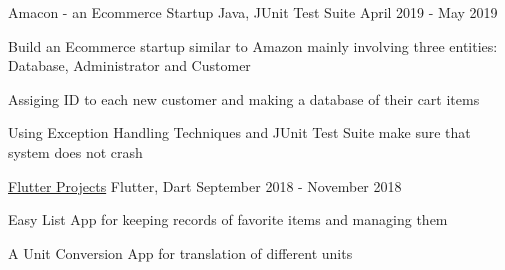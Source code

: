 \begin{cventries}
        \projects
      {} %
       {Amacon - an Ecommerce Startup} %
       {Java, JUnit Test Suite} %
       {April 2019 - May 2019} %
       {
         \begin{cvitems} %
           \item {Build an Ecommerce startup similar to Amazon mainly involving three entities: Database, Administrator and Customer}
           \item {Assiging ID to each new customer and making a database of their cart items}
           \item {Using Exception Handling Techniques and JUnit Test Suite make sure that system does not crash}
         \end{cvitems}
       }


  \projects
    {} %
    {\href{https://github.com/parthgoyal123/Flutter-Projects}{Flutter Projects}} %
    {Flutter, Dart} %
    {September 2018 - November 2018} %
    {
      \begin{cvitems} %
        \item {Easy List App for keeping records of favorite items and managing them}
        \item {A Unit Conversion App for translation of different units}
      \end{cvitems}
    }

 


  


 


\end{cventries}
